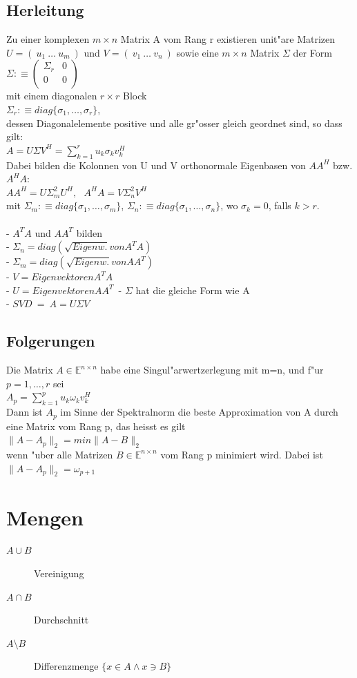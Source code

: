 \documentclass[10pt, a4paper, twocolumn]{scrartcl}
\begin{document}
\subsection{Herleitung}

Zu einer komplexen $m \times n$ Matrix A vom Rang r existieren unit"are Matrizen $U=(\:u_1\:\ldots\:u_m\:)$ und $V=(\:v_1\:\ldots\:v_n\:)$ sowie eine $m \times n$ Matrix $\Sigma$ der Form\\
$\Sigma :\equiv
\left ( 
\begin{array}{cc}
\Sigma_r & 0 \\
0 & 0 \\
\end{array}
\right )
$\\
mit einem diagonalen $r \times r$ Block\\
$\Sigma_r:\equiv diag\{\sigma_1,\ldots,\sigma_r\}$,\\
dessen Diagonalelemente positive und alle gr"osser gleich geordnet sind, so dass gilt:\\
$A=U \Sigma V^H=\sum^r_{k=1}u_k \sigma_k v^H_k$\\
Dabei bilden die Kolonnen von U und V orthonormale Eigenbasen von $AA^H$ bzw. $A^HA$:\\
$AA^H=U\Sigma^2_m U^H,\:\:\:A^HA=V\Sigma^2_n V^H$\\
mit $\Sigma_m:\equiv diag\{\sigma_1,\ldots,\sigma_m\}$, $\Sigma_n:\equiv diag\{\sigma_1,\ldots,\sigma_n\}$, wo $\sigma_k=0$, falls $k > r$.\\\\

- $A^TA$ und $AA^T$ bilden\\
- $\Sigma_n = diag (\sqrt{Eigenw.} von A^TA)$\\ 
- $\Sigma_m = diag (\sqrt{Eigenw.} von AA^T)$\\ 
- $V= Eigenvektoren A^TA$\\
- $U= Eigenvektoren AA^T$\
- $\Sigma$ hat die gleiche Form wie A\\
- $SVD\:=\:A=U \Sigma V$


\subsection{Folgerungen}

Die Matrix $A \in \mathbb{E}^{n\times n}$ habe eine Singul"arwertzerlegung mit m=n, und f"ur $p=1,\ldots,r$ sei\\
$A_p=\sum^p_{k=1}u_k\omega_kv_k^H$\\
Dann ist $A_p$ im Sinne der Spektralnorm die beste Approximation von A durch eine Matrix vom Rang p, das heisst es gilt\\
$\|A-A_p\|_2=min\|A-B\|_2$\\
wenn "uber alle Matrizen $B \in \mathbb{E}^{n \times n}$ vom Rang p minimiert wird. Dabei ist\\
$\|A-A_p\|_2=\omega_{p+1}$

\appendix
 \section{Mengen}
  \begin{description}
   \item[$A \cup B$]Vereinigung
   \item[$A \cap B$]Durchschnitt
   \item[$A \setminus  B$]Differenzmenge $ \{x \in A \land x \ni B \} $
  \end{description}
\end{document}
